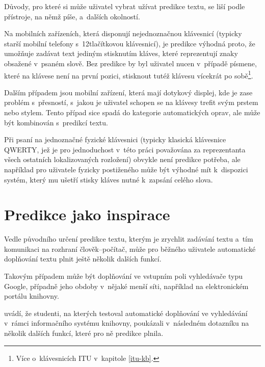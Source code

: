 \documentclass[a4paper,11pt,openany]{book} %
\begin{document}
Důvody, pro které si může uživatel vybrat užívat predikce textu, se liší podle přístroje, na němž píše, a~dalších okolností.

Na mobilních zařízeních, která disponují nejednoznačnou klávesnicí (typicky starší mobilní telefony s~12tlačítkovou klávesnicí), je predikce výhodná proto, že umožňuje zadávat text jediným stisknutím kláves, které reprezentují znaky obsažené v~psaném slově. Bez predikce by byl uživatel nucen v~případě písmene, které na klávese není na první pozici, stisknout tutéž klávesu vícekrát po sobě\footnote{Více o~klávesnicích ITU v~kapitole \ref{itu-kb}.}.

Dalším případem jsou mobilní zařízení, která mají dotykový displej, kde je zase problém s~přesností, s~jakou je uživatel schopen se na klávesy trefit svým prstem nebo stylem. Tento případ sice spadá do kategorie automatických oprav, ale může být kombinován s~predikcí textu. \parencite{kocienda2012method} %

Při psaní na jednoznačné fyzické klávesnici (typicky klasická klávesnice QWERTY, jež je pro jednoduchost v~této práci považována za reprezentanta všech ostatních lokalizovaných rozložení) obvykle není predikce potřeba, ale například pro uživatele fyzicky postiženého může být výhodné mít k~dispozici systém, který mu ušetří stisky kláves nutné k~zapsání celého slova.

\section{Predikce jako inspirace}

Vedle původního určení predikce textu, kterým je zrychlit zadávání textu a~tím komunikaci na rozhraní člověk--počítač, může pro běžného uživatele automatické doplňování textu plnit ještě několik dalších funkcí.

Takovým případem může být doplňování ve vstupním poli vyhledávače typu Google, případně jeho obdoby v~nějaké menší síti, například na elektronickém portálu knihovny. \parencite{google2015}

\parencite{ward2012autocomplete} uvádí, že studenti, na kterých testoval automatické doplňování ve vyhledávání v~rámci informačního systému knihovny, poukázali v~následném dotazníku na několik dalších funkcí, které pro ně predikce plnila.
\end{document}
